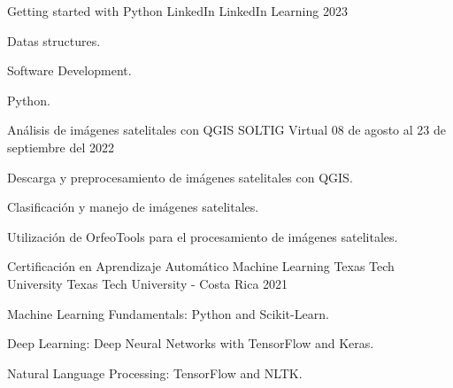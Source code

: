 

\begin{cventries}


  \cventry
  {Getting started with Python} %
    {LinkedIn} %
    {LinkedIn Learning} %
    {2023} %
    {
      \begin{cvitems} %
        \item Datas structures.
        \item Software Development.
        \item Python.
      \end{cvitems}
    }
  \cventry
  {Análisis de imágenes satelitales con QGIS} %
    {SOLTIG} %
    {Virtual} %
    {08 de agosto al 23 de septiembre del 2022} %
    {
      \begin{cvitems} %
        \item Descarga y preprocesamiento de imágenes satelitales con QGIS.
        \item Clasificación y manejo de imágenes satelitales.
        \item Utilización de OrfeoTools para el procesamiento de imágenes satelitales.
      \end{cvitems}
    }
  \cventry
    {Certificación en Aprendizaje Automático Machine Learning} %
    {Texas Tech University} %
    {Texas Tech University - Costa Rica} %
    {2021} %
    {
      \begin{cvitems} %
        \item Machine Learning Fundamentals: Python and Scikit-Learn.
        \item Deep Learning: Deep Neural Networks with TensorFlow and Keras.
        \item Natural Language Processing: TensorFlow and NLTK.

\end{cvitems}}
\end{cventries}

